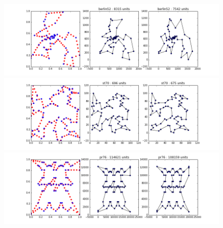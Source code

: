 \documentclass{article} %
\begin{document}
\begin{figure}[!htb]
\begin{center}
\includegraphics[scale=0.45]{figs/berlin52}
\includegraphics[scale=0.45]{figs/st70}
\includegraphics[scale=0.45]{figs/pr76}
 \end{center}
\end{figure}

 
\end{document}

